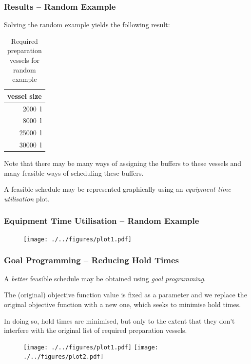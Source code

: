 \documentclass{beamer}
\begin{document}
\begin{frame}
    \frametitle{Results -- Random Example}
    Solving the random example yields the following result:
        \begin{table}
            \centering
            \caption{Required preparation vessels for random example}
            \begin{tabular}{r}
                vessel size\\ \hline
                \SI{2000}{\litre}\\
                \SI{8000}{\litre}\\
                \SI{25000}{\litre}\\
                \SI{30000}{\litre}\\
            \end{tabular}
        \end{table}
    Note that there may be many ways of assigning the buffers to these vessels
    and many feasible ways of scheduling these buffers.
    
    A feasible schedule may be represented graphically using an \emph{equipment
    time utilisation} plot.
\end{frame}

\begin{frame}
    \frametitle{Equipment Time Utilisation -- Random Example}
    \begin{figure}
        \centering
        \texttt{[image: ./../figures/plot1.pdf]}
    \end{figure}
\end{frame}

\begin{frame}
    \frametitle{Goal Programming -- Reducing Hold Times}
    A \emph{better} feasible schedule may be obtained using \emph{goal
    programming}.
    
    The (original) objective function value is fixed as a parameter and we
    replace the original objective function with a new one, which seeks to 
    minimise hold times.
    
    In doing so, hold times are minimised, but only to the extent that they
    don't interfere with the original list of required preparation vessels.
    \begin{figure}
        \centering
        \texttt{[image: ./../figures/plot1.pdf]}
        \texttt{[image: ./../figures/plot2.pdf]}
    \end{figure}
\end{frame}
\end{document}
